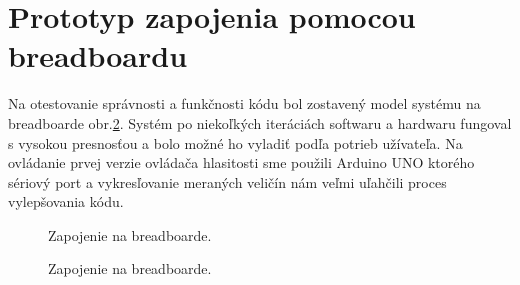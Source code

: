 \section{Prototyp zapojenia pomocou breadboardu}

Na otestovanie správnosti a funkčnosti kódu bol zostavený model systému na breadboarde obr.\ref{OBRAZOK 1.4}. Systém po niekoľkých iteráciách softwaru a hardwaru fungoval s vysokou presnosťou a bolo možné ho vyladiť podľa potrieb užívateľa. Na ovládanie prvej verzie ovládača hlasitosti sme použili Arduino UNO ktorého sériový port a vykresľovanie meraných veličín nám veľmi uľahčili proces vylepšovania kódu.

\begin{figure}[!tbh]
\centering
{}
\caption{Zapojenie na breadboarde.}\label{OBRAZOK 1.4}
\end{figure}

\begin{figure}[!tbh]
\centering
{}
\caption{Zapojenie na breadboarde.}\label{OBRAZOK 1.4}
\end{figure}

